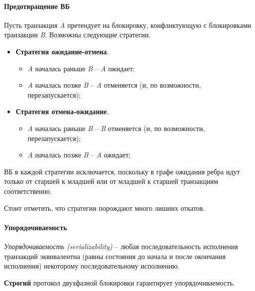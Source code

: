 \paragraph{Предотвращение ВБ}

Пусть транзакция \textit{A} претендует на блокировку, конфликтующую с блокировками
транзакции \textit{B}. Возможны следующие стратегии.

\begin{itemize}
	\item \textbf{Стратегия ожидание-отмена}.
	      \begin{itemize}
		      \item \textit{A} началась раньше \textit{B} -- \textit{A} ожидает;
		      \item \textit{A} началась позже \textit{B} -- \textit{A} отменяется
		            (и, по
		            возможности, перезапускается);
	      \end{itemize}
	\item \textbf{Стратегия отмена-ожидание}.
	      \begin{itemize}
		      \item \textit{A} началась раньше \textit{B} -- \textit{B} отменяется
		            (и, по
		            возможности, перезапускается);
		      \item \textit{A} началась позже \textit{B} -- \textit{A} ожидает;
	      \end{itemize}
\end{itemize}

ВБ в каждой стратегии исключается, поскольку в графе ожидания ребра идут только от старшей к
младшей или от младшей к старшей транзакциям соответственно.

Стоит отметить, что стратегии порождают много лишних откатов.

\paragraph{Упорядочиваемость}

\begin{definition}
	\textit{Упорядочиваемость (serializability)} -- любая последовательность исполнения транзакций эквивалентна
	(равны состояния до начала и после окончания исполнения) некоторому последовательному
	исполнению.
\end{definition}

\begin{proposition}
	\textbf{Строгий} протокол двухфазной блокировки гарантирует упорядочиваемость.
\end{proposition}

